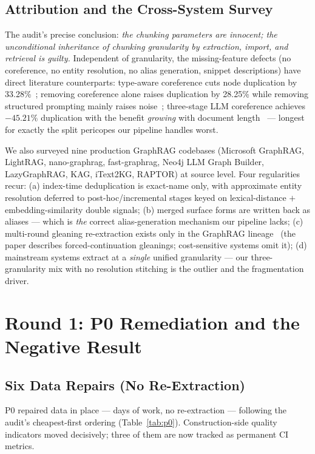 \subsection{Attribution and the Cross-System Survey}

The audit's precise conclusion: \emph{the chunking parameters are
innocent; the unconditional inheritance of chunking granularity by
extraction, import, and retrieval is guilty.} Independent of
granularity, the missing-feature defects (no coreference, no entity
resolution, no alias generation, snippet descriptions) have direct
literature counterparts: type-aware coreference cuts node duplication by
33.28\%~\cite{meher2025corekg}; removing coreference alone raises
duplication by 28.25\% while removing structured prompting mainly raises
noise~\cite{meher2025insidecorekg}; three-stage LLM coreference achieves
$-45.21\%$ duplication with the benefit \emph{growing} with document
length~\cite{meher2025linkkg} --- longest for exactly the split
pericopes our pipeline handles worst.

We also surveyed nine production GraphRAG codebases (Microsoft GraphRAG,
LightRAG, nano-graphrag, fast-graphrag, Neo4j LLM Graph Builder,
LazyGraphRAG, KAG, iText2KG, RAPTOR) at source level. Four regularities
recur: (a) index-time deduplication is exact-name only, with approximate
entity resolution deferred to post-hoc/incremental stages keyed on
lexical-distance $+$ embedding-similarity double signals; (b) merged
surface forms are written back as aliases --- which is \emph{the}
correct alias-generation mechanism our pipeline lacks; (c) multi-round
gleaning re-extraction exists only in the GraphRAG
lineage~\cite{edge2024graphrag} (the paper describes forced-continuation
gleanings; cost-sensitive systems omit it); (d) mainstream systems
extract at a \emph{single} unified granularity --- our three-granularity
mix with no resolution stitching is the outlier and the fragmentation
driver.

\section{Round 1: P0 Remediation and the Negative Result}
\label{sec:p0}

\subsection{Six Data Repairs (No Re-Extraction)}

P0 repaired data in place --- days of work, no re-extraction ---
following the audit's cheapest-first ordering
(Table~\ref{tab:p0}). Construction-side quality indicators moved
decisively; three of them are now tracked as permanent CI metrics.

